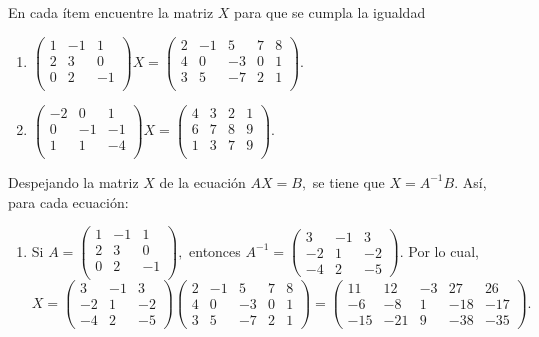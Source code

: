 \begin{prob} 
En cada ítem encuentre la matriz $X$ para que se cumpla la igualdad 

\begin{enumerate}[$a)$]
\item $\left( \begin{array}{ccc}
1&-1&1\\
2&3&0\\
0&2&-1\\
\end{array} \right) X= \left( \begin{array}{ccccc}
2&-1&5&7&8\\
4&0&-3&0&1\\
3&5&-7&2&1\\
\end{array} \right).$ 

\item $\left( \begin{array}{ccc}
-2&0&1\\
0&-1&-1\\
1&1&-4\\
\end{array} \right) X= \left( \begin{array}{cccc}
4&3&2&1\\
6&7&8&9\\
1&3&7&9\\
\end{array} \right).$ 
\end{enumerate}

\begin{myproof}
Despejando la matriz $X$ de la ecuación $AX=B,$ se tiene que $X=A^{-1}B.$ Así, para cada ecuación:

\begin{enumerate}[$(a)$]
\item Si $A=\left( \begin{array}{ccc}
1&-1&1\\
2&3&0\\
0&2&-1\\
\end{array} \right),$ entonces $A^{-1}=\begin{pmatrix}
3 & -1 & 3 \\
-2 & 1 & -2 \\
-4 & 2 & -5
\end{pmatrix}.$ Por lo cual, 
$$X=\begin{pmatrix}
3 & -1 & 3 \\
-2 & 1 & -2 \\
-4 & 2 & -5
\end{pmatrix}\begin{pmatrix}
2 & -1 & 5 & 7 & 8 \\
4 & 0 & -3 & 0 & 1 \\
3 & 5 & -7 & 2 & 1
\end{pmatrix}=\begin{pmatrix}
11 & 12 & -3 & 27 & 26 \\
-6 & -8 & 1 & -18 & -17 \\
-15 & -21 & 9 & -38 & -35
\end{pmatrix}.$$


\end{enumerate}
\end{myproof}
\end{prob}

